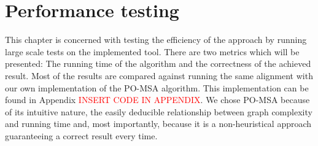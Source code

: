 \documentclass[thesis.tex]{subfiles}
\begin{document}
\chapter{Performance testing}
\label{sec:performance}
This chapter is concerned with testing the efficiency of the approach by running large scale tests on the implemented tool. There are two metrics which will be presented: The running time of the algorithm and the correctness of the achieved result. Most of the results are compared against running the same alignment with our own implementation of the PO-MSA algorithm. This implementation can be found in Appendix \textcolor{red}{INSERT CODE IN APPENDIX}. We chose PO-MSA because of its intuitive nature, the easily deducible relationship between graph complexity and running time and, most importantly, because it is a non-heuristical approach guaranteeing a correct result every time.
\end{document}
